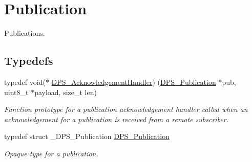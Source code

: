 \hypertarget{group__publication}{}\section{Publication}
\label{group__publication}


Publications.  


\subsection*{Typedefs}
\begin{DoxyCompactItemize}
\item 
typedef void($\ast$ \hyperlink{group__publication_gaf8615f0bcd3d95859cd7f2cdbf772e23}{D\+P\+S\+\_\+\+Acknowledgement\+Handler}) (\hyperlink{group__publication_ga0d439693474aa54e27f3d45a054696ac}{D\+P\+S\+\_\+\+Publication} $\ast$pub, uint8\+\_\+t $\ast$payload, size\+\_\+t len)
\begin{DoxyCompactList}\small\item\em Function prototype for a publication acknowledgement handler called when an acknowledgement for a publication is received from a remote subscriber. \end{DoxyCompactList}\item 
\mbox{\label{group__publication_ga0d439693474aa54e27f3d45a054696ac}} 
typedef struct \+\_\+\+D\+P\+S\+\_\+\+Publication \hyperlink{group__publication_ga0d439693474aa54e27f3d45a054696ac}{D\+P\+S\+\_\+\+Publication}
\begin{DoxyCompactList}\small\item\em Opaque type for a publication. \end{DoxyCompactList}\end{DoxyCompactItemize}
